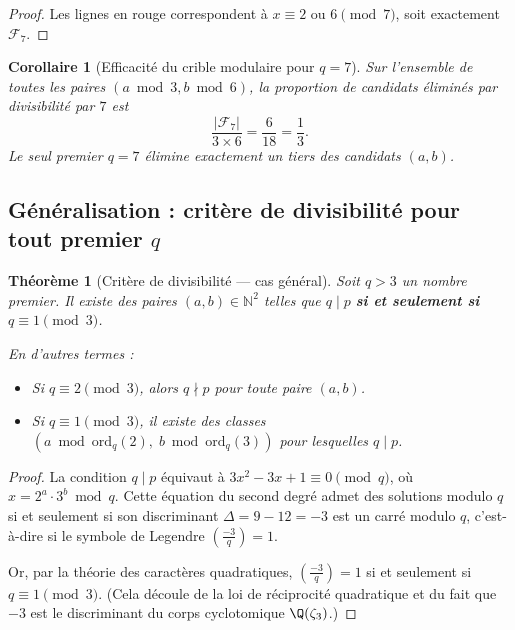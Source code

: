 \documentclass[12pt,a4paper]{article}
\newtheorem{theoreme}{Théorème}
\newtheorem{corollaire}{Corollaire}
\theoremstyle{definition}
\newcommand{\N}{\mathbb{N}}
\newcommand{\ord}{\mathrm{ord}}
\begin{document}
\begin{proof}
  Les lignes en rouge correspondent à $x \equiv 2$ ou $6 \pmod 7$,
  soit exactement $\mathcal{F}_7$.
\end{proof}

\begin{corollaire}[Efficacité du crible modulaire pour $q=7$]
  Sur l'ensemble de toutes les paires $(a \bmod 3, b \bmod 6)$,
  la proportion de candidats éliminés par divisibilité par $7$ est
  \[
    \frac{|\mathcal{F}_7|}{3 \times 6} = \frac{6}{18} = \frac{1}{3}.
  \]
  Le seul premier $q = 7$ élimine exactement un tiers des candidats $(a,b)$.
\end{corollaire}

\subsection{Généralisation : critère de divisibilité pour tout premier $q$}

\begin{theoreme}[Critère de divisibilité — cas général]\label{thm:qmod3}
  Soit $q > 3$ un nombre premier.
  Il existe des paires $(a,b) \in \N^2$ telles que $q \mid p$
  \textbf{si et seulement si} $q \equiv 1 \pmod{3}$.

  En d'autres termes :
  \begin{itemize}
    \item Si $q \equiv 2 \pmod{3}$, alors $q \nmid p$ pour toute paire $(a,b)$.
    \item Si $q \equiv 1 \pmod{3}$, il existe des classes $(a \bmod \ord_q(2),\;
          b \bmod \ord_q(3))$ pour lesquelles $q \mid p$.
  \end{itemize}
\end{theoreme}

\begin{proof}
  La condition $q \mid p$ équivaut à
  $3x^2 - 3x + 1 \equiv 0 \pmod{q}$, où $x = 2^a \cdot 3^b \bmod q$.
  Cette équation du second degré admet des solutions modulo $q$
  si et seulement si son discriminant $\Delta = 9 - 12 = -3$
  est un carré modulo $q$, c'est-à-dire si le symbole de Legendre
  $\left(\frac{-3}{q}\right) = 1$.

  Or, par la théorie des caractères quadratiques,
  $\left(\frac{-3}{q}\right) = 1$ si et seulement si $q \equiv 1 \pmod{3}$.
  (Cela découle de la loi de réciprocité quadratique et du fait que
  $-3$ est le discriminant du corps cyclotomique $\Q(\zeta_3)$.)
\end{proof}
\end{document}
